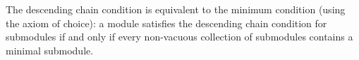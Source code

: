 The descending chain condition is equivalent to the minimum condition (using the axiom of choice): a module satisfies the descending chain condition for submodules if and only if every non-vacuous collection of submodules contains a minimal submodule.
